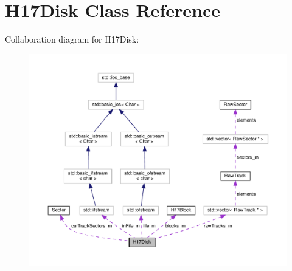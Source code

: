 \hypertarget{classH17Disk}{}\section{H17\+Disk Class Reference}
\label{classH17Disk}


Collaboration diagram for H17\+Disk\+:
\nopagebreak
\begin{figure}[H]
\begin{center}
\leavevmode
\includegraphics[width=350pt]{classH17Disk__coll__graph}
\end{center}
\end{figure}
